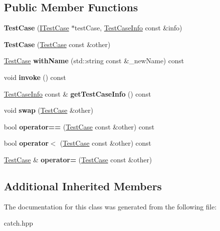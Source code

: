 \subsection*{Public Member Functions}
\begin{DoxyCompactItemize}
\item 
\mbox{\label{classCatch_1_1TestCase_a03a5b913484681bd6d398dc5e9c2a907}} 
{\bfseries Test\+Case} (\hyperlink{structCatch_1_1ITestCase}{I\+Test\+Case} $\ast$test\+Case, \hyperlink{structCatch_1_1TestCaseInfo}{Test\+Case\+Info} const \&info)
\item 
\mbox{\label{classCatch_1_1TestCase_ac0011d3789edc3e44edb41f13c4775a0}} 
{\bfseries Test\+Case} (\hyperlink{classCatch_1_1TestCase}{Test\+Case} const \&other)
\item 
\mbox{\label{classCatch_1_1TestCase_a0812e8a216d09b087d5874687009f0d6}} 
\hyperlink{classCatch_1_1TestCase}{Test\+Case} {\bfseries with\+Name} (std\+::string const \&\+\_\+new\+Name) const
\item 
\mbox{\label{classCatch_1_1TestCase_a26f346c8446dded0562fe3818ae71651}} 
void {\bfseries invoke} () const
\item 
\mbox{\label{classCatch_1_1TestCase_a1ea0d79f49156cebea076fe1ba50d2b6}} 
\hyperlink{structCatch_1_1TestCaseInfo}{Test\+Case\+Info} const  \& {\bfseries get\+Test\+Case\+Info} () const
\item 
\mbox{\label{classCatch_1_1TestCase_aee38f908faf10b905b209ca388275413}} 
void {\bfseries swap} (\hyperlink{classCatch_1_1TestCase}{Test\+Case} \&other)
\item 
\mbox{\label{classCatch_1_1TestCase_a5456d03a90f75292835c158f3a3374a1}} 
bool {\bfseries operator==} (\hyperlink{classCatch_1_1TestCase}{Test\+Case} const \&other) const
\item 
\mbox{\label{classCatch_1_1TestCase_a030e4b9282e9b32e08c8bd5e5cd6fa98}} 
bool {\bfseries operator$<$} (\hyperlink{classCatch_1_1TestCase}{Test\+Case} const \&other) const
\item 
\mbox{\label{classCatch_1_1TestCase_a8022e3f74232f7887d2d2cbbc8876502}} 
\hyperlink{classCatch_1_1TestCase}{Test\+Case} \& {\bfseries operator=} (\hyperlink{classCatch_1_1TestCase}{Test\+Case} const \&other)
\end{DoxyCompactItemize}
\subsection*{Additional Inherited Members}


The documentation for this class was generated from the following file\+:\begin{DoxyCompactItemize}
\item 
catch.\+hpp\end{DoxyCompactItemize}
